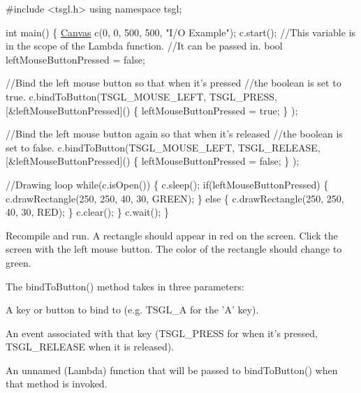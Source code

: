 \begin{DoxyCode}
\textcolor{preprocessor}{#include <tsgl.h>}
\textcolor{keyword}{using namespace }tsgl;

\textcolor{keywordtype}{int} main() \{
  \hyperlink{classtsgl_1_1_canvas}{Canvas} c(0, 0, 500, 500, \textcolor{stringliteral}{"I/O Example"});
  c.start();
  \textcolor{comment}{//This variable is in the scope of the Lambda function. }
  \textcolor{comment}{//It can be passed in.}
  \textcolor{keywordtype}{bool} leftMouseButtonPressed = \textcolor{keyword}{false};

  \textcolor{comment}{//Bind the left mouse button so that when it's pressed }
  \textcolor{comment}{//the boolean is set to true.}
  c.bindToButton(TSGL\_MOUSE\_LEFT, TSGL\_PRESS, 
                    [&leftMouseButtonPressed]() \{
                          leftMouseButtonPressed = \textcolor{keyword}{true};
                    \}
                );

  \textcolor{comment}{//Bind the left mouse button again so that when it's released }
  \textcolor{comment}{//the boolean is set to false.}
  c.bindToButton(TSGL\_MOUSE\_LEFT, TSGL\_RELEASE, 
                    [&leftMouseButtonPressed]() \{
                          leftMouseButtonPressed = \textcolor{keyword}{false};
                    \}
                );

  \textcolor{comment}{//Drawing loop}
  \textcolor{keywordflow}{while}(c.isOpen()) \{
    c.sleep();
    \textcolor{keywordflow}{if}(leftMouseButtonPressed) \{
      c.drawRectangle(250, 250, 40, 30, GREEN);
    \} \textcolor{keywordflow}{else} \{
      c.drawRectangle(250, 250, 40, 30, RED);
    \}
    c.clear();
  \}
  c.wait();
\}
\end{DoxyCode}


Recompile and run. A rectangle should appear in red on the screen. Click the screen with the left mouse button. The color of the rectangle should change to green.

The {\ttfamily bind\-To\-Button()} method takes in three parameters\-:
\begin{DoxyItemize}
\item A key or button to bind to (e.\-g. {\ttfamily T\-S\-G\-L\-\_\-\-A} for the 'A' key).
\item An event associated with that key ({\ttfamily T\-S\-G\-L\-\_\-\-P\-R\-E\-S\-S} for when it's pressed, {\ttfamily T\-S\-G\-L\-\_\-\-R\-E\-L\-E\-A\-S\-E} when it is released).
\item An unnamed (Lambda) function that will be passed to {\ttfamily bind\-To\-Button()} when that method is invoked.
\end{DoxyItemize}

